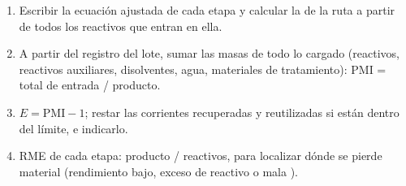 \begin{method}\label{met:b3:green-industrial:metrics}
\begin{enumerate}
  \item Escribir la ecuación ajustada de cada etapa y calcular la  de la
        ruta a partir de todos los reactivos que entran en ella.
  \item A partir del registro del lote, sumar las masas de todo lo cargado (reactivos,
        reactivos auxiliares, disolventes, agua, materiales de tratamiento): PMI = total de entrada / producto.
  \item $E = \mathrm{PMI} - 1$; restar las corrientes recuperadas y reutilizadas si están dentro del
        límite, e indicarlo.
  \item RME de cada etapa: producto / reactivos, para localizar dónde se pierde material
        (rendimiento bajo, exceso de reactivo o mala ).
\end{enumerate}
\end{method}

